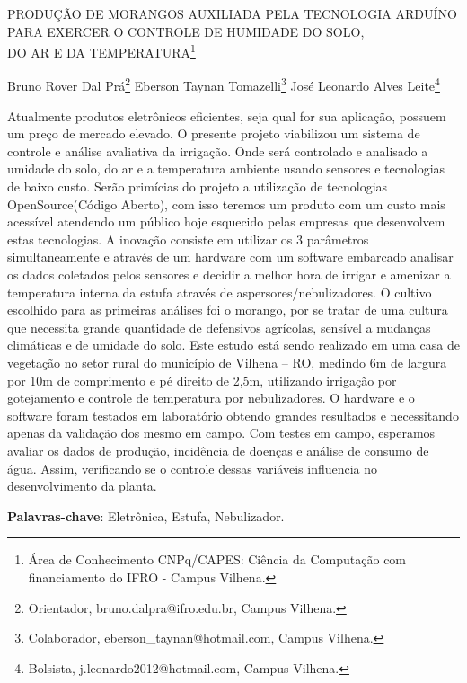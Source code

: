 \documentclass[article,12pt,onesidea,4paper,english,brazil]{abntex2}
\begin{document}
	
	
	\frenchspacing 
	
	\begin{center}
		\LARGE PRODUÇÃO DE MORANGOS AUXILIADA PELA TECNOLOGIA ARDUÍNO PARA EXERCER O CONTROLE DE HUMIDADE DO SOLO,\\DO AR E DA TEMPERATURA\footnote{Área de Conhecimento CNPq/CAPES: Ciência da Computação com financiamento do IFRO - Campus Vilhena.}
		
		\normalsize
		Bruno Rover Dal Prá\footnote{Orientador, bruno.dalpra@ifro.edu.br, Campus Vilhena.} 
	Eberson Taynan Tomazelli\footnote{Colaborador, eberson\_taynan@hotmail.com, Campus Vilhena.} 
		José Leonardo Alves Leite\footnote{Bolsista, j.leonardo2012@hotmail.com, Campus Vilhena.} 
	\end{center}
	
	\begin{resumoumacoluna}
		Atualmente produtos eletrônicos eficientes, seja qual for sua aplicação, possuem um preço de mercado elevado. O presente projeto viabilizou um sistema de controle e análise avaliativa da irrigação. Onde será controlado e analisado a umidade do solo, do ar e a temperatura ambiente usando sensores e tecnologias de baixo custo. Serão primícias do projeto a utilização de tecnologias OpenSource(Código Aberto), com isso teremos um produto com um custo mais acessível atendendo um público hoje esquecido pelas empresas que desenvolvem estas tecnologias. A inovação consiste em utilizar os 3 parâmetros simultaneamente e através de um hardware com um software embarcado analisar os dados coletados pelos sensores e decidir a melhor hora de irrigar e amenizar a temperatura interna da estufa através de aspersores/nebulizadores. O cultivo escolhido para as primeiras análises foi o morango, por se tratar de uma cultura que necessita grande quantidade de defensivos agrícolas, sensível a mudanças climáticas e de umidade do solo. Este estudo está sendo realizado em uma casa de vegetação no setor rural do município de Vilhena – RO, medindo 6m de largura por 10m de comprimento e pé direito de 2,5m, utilizando irrigação por gotejamento e controle de temperatura por nebulizadores. O hardware e o software foram testados em laboratório obtendo grandes resultados e necessitando apenas da validação dos mesmo em campo. Com testes em campo, esperamos avaliar os dados de produção, incidência de doenças e análise de consumo de água. Assim, verificando se o controle dessas variáveis influencia no desenvolvimento da planta.
		\vspace{\onelineskip}
		
		\noindent
		\textbf{Palavras-chave}: Eletrônica, Estufa, Nebulizador.
	\end{resumoumacoluna}
	
\end{document}

